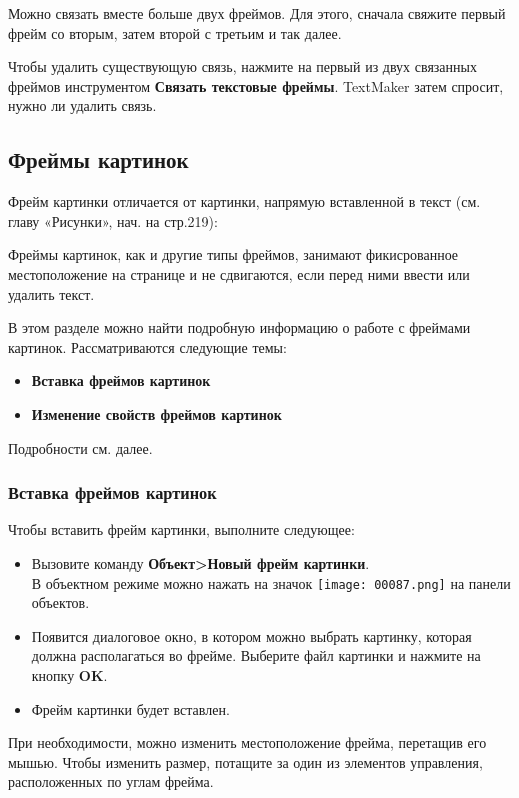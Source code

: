 \documentclass[a4paper,10pt]{article}
\begin{document}
Можно связать вместе больше двух фреймов. Для этого, сначала свяжите первый фрейм со вторым, затем второй с третьим и так далее.

Чтобы удалить существующую связь, нажмите на первый из двух связанных фреймов инструментом \textbf{Связать текстовые фреймы}. TextMaker затем спросит, нужно ли удалить связь.

\subsection{Фреймы картинок}
Фрейм картинки отличается от картинки, напрямую вставленной в текст (см. главу «Рисунки», нач. на стр.219):

Фреймы картинок, как и другие типы фреймов, занимают фикисрованное местоположение на странице и не сдвигаются, если перед ними ввести или удалить текст.

В этом разделе можно  найти подробную информацию о работе с фреймами картинок. Рассматриваются следующие темы:

\begin{itemize}
 \item \textbf{Вставка фреймов картинок}
 \item \textbf{Изменение свойств фреймов картинок}
\end{itemize}

Подробности см. далее.

\subsubsection{Вставка фреймов картинок}
Чтобы вставить фрейм картинки, выполните следующее:
\begin{itemize}
 \item Вызовите команду \textbf{Объект>Новый фрейм картинки}.\\
 В объектном режиме можно нажать на значок \texttt{[image: 00087.png]} на панели объектов.
 \item Появится диалоговое окно, в котором можно выбрать картинку, которая должна располагаться во фрейме. Выберите файл картинки и нажмите на кнопку \textbf{OK}.
 \item Фрейм картинки будет вставлен.
\end{itemize}

При необходимости, можно изменить местоположение фрейма, перетащив его мышью. Чтобы изменить размер, потащите за один из элементов управления, расположенных по углам фрейма.
\end{document}

